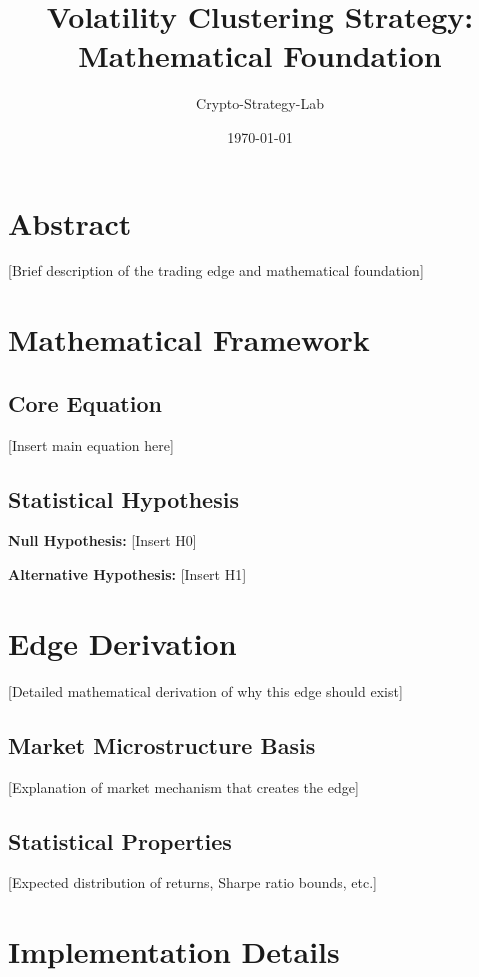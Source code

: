 \documentclass{article}
\title{Volatility Clustering Strategy: Mathematical Foundation}
\author{Crypto-Strategy-Lab}
\date{\today}
\begin{document}
\maketitle

\section{Abstract}

[Brief description of the trading edge and mathematical foundation]

\section{Mathematical Framework}

\subsection{Core Equation}

[Insert main equation here]

\subsection{Statistical Hypothesis}

\textbf{Null Hypothesis:} [Insert H0]

\textbf{Alternative Hypothesis:} [Insert H1]

\section{Edge Derivation}

[Detailed mathematical derivation of why this edge should exist]

\subsection{Market Microstructure Basis}

[Explanation of market mechanism that creates the edge]

\subsection{Statistical Properties}

[Expected distribution of returns, Sharpe ratio bounds, etc.]

\section{Implementation Details}
\end{document}
